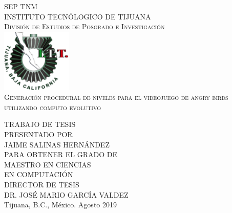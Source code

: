 \begin{titlepage}
  \begin{center}
  \textsc{\Large SEP}
  \:\:\:\:\:\:\:\:\:\:\:\:\:\:\:\:\:\:\:\:\:\:\:\:\:\:\:\:\:\:\:\:\:\:\:\:
\:\:\:\:\:\:\:\:\:\:\:\:\:\:\:\:\:\:\:\:\:\:\:\:\:\:\:\:\:\:\:\:\:\:\:\:
\:\:\:\:\:\:\:\:\:\:\:\:\:\:\:\:
  \textsc{\Large TNM}~\\[1cm]
  \textsc{\Large INSTITUTO TECNÓLOGICO DE TIJUANA}~\\[1cm]
  \textsc{\Large División de Estudios de Posgrado e
    Investigación}~\\[0.5cm]

    \includegraphics[width=0.25\textwidth]{./logos.png}~\\[1cm]

    
    \textsc{\LARGE Generación procedural de niveles para el videojuego de angry birds utilizando computo evolutivo}~\\[1.5cm]




\begin{minipage}{1\textwidth}
  \begin{flushright} \large
    TRABAJO DE TESIS~\\[0.5cm]
    \small
    PRESENTADO POR~\\[0.5cm]
    \large
    JAIME SALINAS HERNÁNDEZ ~\\[0.5cm]
    \small
    PARA OBTENER EL GRADO DE~\\[0.5cm]
    \large
    MAESTRO EN CIENCIAS~\\
    EN COMPUTACIÓN~\\[0.5cm]
    \small
    DIRECTOR DE TESIS~\\
    \large
    DR. JOSÉ MARIO GARCÍA VALDEZ~\\[0.5cm]
    \small
    Tijuana, B.C., México. Agosto 2019
  \end{flushright}
\end{minipage}


\end{center}
\end{titlepage}
